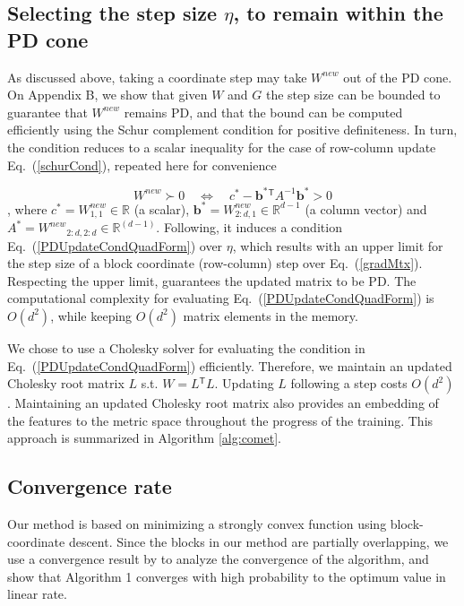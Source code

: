 \documentclass[twoside,11pt]{article}
\newcommand\mat[1]{{#1}}
\renewcommand\vec[1]{\mathbf{#1}}
\newcommand{\T}{{}^\mathsf{T}}
\newcommand{\W}{\mat{W}}
\newcommand{\newW}{{\mat{W^{new}}}}
\newcommand{\R}{\mathbb{R}}
\newcommand{\cholL}{\mat{L}}
\newcommand{\B}{\vec{b}}
\newcommand{\C}{c}
\newcommand{\invA}{A^{-1}}
\newcommand{\Wvec}{\W_{2:d,1}}
\newcommand{\Wscalar}{\W_{1,1}}
\renewcommand{\eqref}[1]{Eq.~(\ref{#1})}
\begin{document}
\subsection{Selecting the step size $\eta$, to remain within the PD cone}\label{subsec:step}
As discussed above, taking a coordinate step may take $\newW$ out of the PD cone. On Appendix B, we show that given $\W$ and $\mat{G}$ the step size can be bounded to guarantee that $\newW$ remains PD, and that the bound can be computed efficiently using the Schur complement condition for positive definiteness. In turn, the condition reduces to a scalar inequality for the case of row-column update \eqref{schurCond}, repeated here for convenience

\begin{equation*}
  \newW \succ  0 \quad \Leftrightarrow \quad  \C^* - \B^*\T \invA \B^* >  0
\end{equation*},
where $\C^* = \Wscalar^{new} \in \R$ (a scalar), $\B^* = \Wvec^{new} \in \R^{d-1}$ (a column vector) and $A^* = \newW_{2:d,2:d} \in \R^{(d-1)}$. Following, it induces a condition \eqref{PDUpdateCondQuadForm} over $\eta$, which results with an upper limit for the step size of a block coordinate (row-column) step over \eqref{gradMtx}. Respecting the upper limit, guarantees  the updated matrix to be PD. The computational complexity for evaluating  \eqref{PDUpdateCondQuadForm} is $O(d^2)$, while keeping $O(d^2)$ matrix elements in the memory.

We chose to use a Cholesky solver \citep{CHOLMOD} for evaluating the condition in \eqref{PDUpdateCondQuadForm} efficiently. Therefore, we maintain an updated Cholesky root matrix $\cholL$ s.t. $W = \cholL\T \cholL$. Updating $\cholL$ following a step costs $O(d^2)$ \citep{Davis05rowchol}. Maintaining an updated Cholesky root matrix also provides an embedding of the features to the metric space throughout the progress of the training. This approach is summarized in Algorithm \ref{alg:comet}.


\subsection{Convergence rate}
Our method is based on minimizing a strongly convex function using block-coordinate descent. Since the blocks in our method are partially overlapping, we use a convergence result by \citet{richtarik2013optimal} to analyze the convergence of the algorithm, and show that Algorithm 1 converges with high probability to the optimum value in linear rate.  
\end{document}
